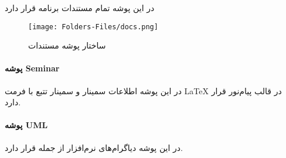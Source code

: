 در این پوشه تمام مستندات برنامه قرار دارد

\begin{figure}[H]
	\texttt{[image: Folders-Files/docs.png]}
	\centering
	\caption{ساختار پوشه مستندات}
	\label{fig:folder-docs}
\end{figure}

\paragraph{پوشه Seminar}
در این پوشه اطلاعات سمینار و سمینار تتبع با فرمت  
\LaTeX
 در قالب پیام‌نور قرار دارد.
 
 \paragraph{پوشه UML}
 در این پوشه دیاگرام‌های نرم‌افزار از جمله
 قرار دارد.